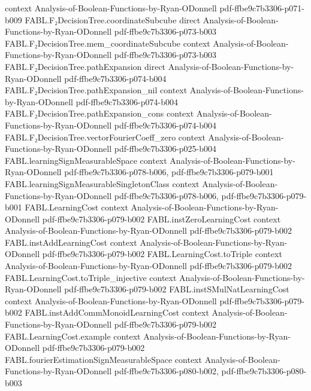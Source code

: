 \begin{theorem}
  {context}
  {Analysis-of-Boolean-Functions-by-Ryan-ODonnell}
  {pdf-ffbe9c7b3306-p071-b009}
\proofstep
  {FABL.F₂DecisionTree.coordinateSubcube}
  {direct}
  {Analysis-of-Boolean-Functions-by-Ryan-ODonnell}
  {pdf-ffbe9c7b3306-p073-b003}
\proofstep
  {FABL.F₂DecisionTree.mem_coordinateSubcube}
  {context}
  {Analysis-of-Boolean-Functions-by-Ryan-ODonnell}
  {pdf-ffbe9c7b3306-p073-b003}
\proofstep
  {FABL.F₂DecisionTree.pathExpansion}
  {direct}
  {Analysis-of-Boolean-Functions-by-Ryan-ODonnell}
  {pdf-ffbe9c7b3306-p074-b004}
\proofstep
  {FABL.F₂DecisionTree.pathExpansion_nil}
  {context}
  {Analysis-of-Boolean-Functions-by-Ryan-ODonnell}
  {pdf-ffbe9c7b3306-p074-b004}
\proofstep
  {FABL.F₂DecisionTree.pathExpansion_cons}
  {context}
  {Analysis-of-Boolean-Functions-by-Ryan-ODonnell}
  {pdf-ffbe9c7b3306-p074-b004}
\proofstep
  {FABL.F₂DecisionTree.vectorFourierCoeff_zero}
  {context}
  {Analysis-of-Boolean-Functions-by-Ryan-ODonnell}
  {pdf-ffbe9c7b3306-p025-b004}
\proofstep
  {FABL.learningSignMeasurableSpace}
  {context}
  {Analysis-of-Boolean-Functions-by-Ryan-ODonnell}
  {pdf-ffbe9c7b3306-p078-b006,
    pdf-ffbe9c7b3306-p079-b001}
\proofstep
  {FABL.learningSignMeasurableSingletonClass}
  {context}
  {Analysis-of-Boolean-Functions-by-Ryan-ODonnell}
  {pdf-ffbe9c7b3306-p078-b006,
    pdf-ffbe9c7b3306-p079-b001}
\proofstep
  {FABL.LearningCost}
  {context}
  {Analysis-of-Boolean-Functions-by-Ryan-ODonnell}
  {pdf-ffbe9c7b3306-p079-b002}
\proofstep
  {FABL.instZeroLearningCost}
  {context}
  {Analysis-of-Boolean-Functions-by-Ryan-ODonnell}
  {pdf-ffbe9c7b3306-p079-b002}
\proofstep
  {FABL.instAddLearningCost}
  {context}
  {Analysis-of-Boolean-Functions-by-Ryan-ODonnell}
  {pdf-ffbe9c7b3306-p079-b002}
\proofstep
  {FABL.LearningCost.toTriple}
  {context}
  {Analysis-of-Boolean-Functions-by-Ryan-ODonnell}
  {pdf-ffbe9c7b3306-p079-b002}
\proofstep
  {FABL.LearningCost.toTriple_injective}
  {context}
  {Analysis-of-Boolean-Functions-by-Ryan-ODonnell}
  {pdf-ffbe9c7b3306-p079-b002}
\proofstep
  {FABL.instSMulNatLearningCost}
  {context}
  {Analysis-of-Boolean-Functions-by-Ryan-ODonnell}
  {pdf-ffbe9c7b3306-p079-b002}
\proofstep
  {FABL.instAddCommMonoidLearningCost}
  {context}
  {Analysis-of-Boolean-Functions-by-Ryan-ODonnell}
  {pdf-ffbe9c7b3306-p079-b002}
\proofstep
  {FABL.LearningCost.example}
  {context}
  {Analysis-of-Boolean-Functions-by-Ryan-ODonnell}
  {pdf-ffbe9c7b3306-p079-b002}
\proofstep
  {FABL.fourierEstimationSignMeasurableSpace}
  {context}
  {Analysis-of-Boolean-Functions-by-Ryan-ODonnell}
  {pdf-ffbe9c7b3306-p080-b002,
    pdf-ffbe9c7b3306-p080-b003}

\end{theorem}
